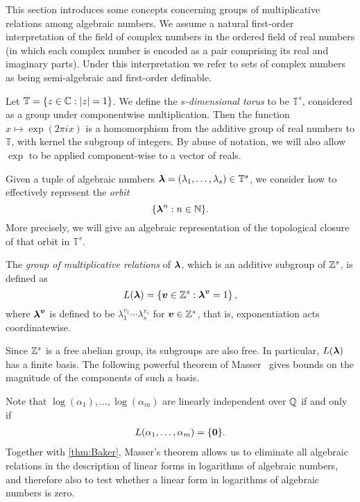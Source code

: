 \label{sec:mult}

This section introduces some concepts concerning groups of multiplicative relations among algebraic numbers. We assume a natural first-order interpretation of the field of complex numbers in the ordered field of real numbers (in which each complex number is encoded as a pair comprising its real and imaginary parts). Under this interpretation we refer to sets of complex numbers as being semi-algebraic and first-order definable.

Let $\mathbb{T}=\lbrace z \in \mathbb{C}: \lvert z \rvert = 1 \rbrace$. We define the \emph{$s$-dimensional torus} to be $\mathbb{T}^s$, considered as a group under componentwise multiplication. Then the function $x \mapsto \exp(2 \pi i x)$ is a homomorphism from the additive group of real numbers to $\mathbb{T}$, with kernel the subgroup of integers. By abuse of notation, we will also allow $\exp$ to be applied component-wise to a vector of reals.

Given a tuple of algebraic numbers $\boldsymbol{\lambda} = (\lambda_{1}, \ldots, \lambda_{s}) \in \mathbb{T}^{s}$, we consider how to effectively represent the \emph{orbit}
\begin{equation*}
\lbrace \boldsymbol{\lambda}^{n} : n \in \mathbb{N} \rbrace.
\end{equation*}
More precisely, we will give an algebraic representation of the topological closure of that orbit in $\mathbb{T}^s$.

The \emph{group of multiplicative relations} of $\boldsymbol{\lambda}$, which is an additive subgroup of $\mathbb{Z}^s$, is defined as
\begin{equation*}
L(\boldsymbol{\lambda})=\lbrace \boldsymbol{v}\in \mathbb{Z}^s : \boldsymbol\lambda^{\boldsymbol v}=1 \rbrace \, ,
\end{equation*}
where $\boldsymbol\lambda^{\boldsymbol v}$ is defined to be $\lambda_1^{v_1}\cdots\lambda_s^{v_s}$ for $\boldsymbol{v}\in \mathbb{Z}^s$, that is, exponentiation acts coordinatewise.

Since $\mathbb{Z}^s$ is a free abelian group, its subgroups are also
free.  In particular, $L(\boldsymbol\lambda)$ has a finite basis. The
following powerful theorem of Masser~\cite{Mas88} gives bounds on the
magnitude of the components of such a basis.

Note that $\log(\alpha_{1}), \ldots, \log(\alpha_{m})$ are linearly independent over $\mathbb{Q}$ if and only if
\begin{align*}
L(\alpha_{1}, \ldots, \alpha_{m}) = \lbrace \boldsymbol{0} \rbrace .
\end{align*}
Together with \cref{thm:Baker}, Masser's theorem allows us to eliminate all algebraic relations in the description of linear forms in logarithms of algebraic numbers, and therefore also to test whether a linear form in logarithms of algebraic numbers is zero.

